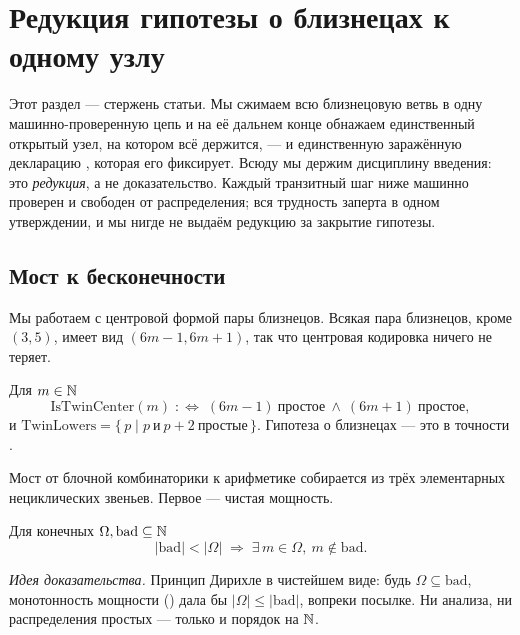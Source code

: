 \section{Редукция гипотезы о близнецах к одному узлу}\label{sec:reduction}

Этот раздел --- стержень статьи. Мы сжимаем всю близнецовую ветвь в одну машинно-проверенную цепь
и на её дальнем конце обнажаем единственный открытый узел, на котором всё держится, --- и
единственную заражённую  декларацию , которая его
фиксирует. Всюду мы держим дисциплину введения: это \emph{редукция}, а не доказательство. Каждый
транзитный шаг ниже \green{} машинно проверен и свободен от распределения; вся трудность заперта в
одном \red{} утверждении, и мы нигде не выдаём редукцию за закрытие гипотезы.

\subsection{Мост к бесконечности}

Мы работаем с центровой формой пары близнецов. Всякая пара близнецов, кроме $(3,5)$, имеет вид
$(6m-1,6m+1)$, так что центровая кодировка ничего не теряет.

\begin{definition}\label{def:istwincenter}
Для $m\in\mathbb{N}$
\[
  \mathrm{IsTwinCenter}(m)\;:\Longleftrightarrow\;(6m-1)\ \text{простое}\ \wedge\ (6m+1)\ \text{простое},
\]
и $\mathrm{TwinLowers}=\{\,p\mid p\ \text{и}\ p+2\ \text{простые}\,\}$. Гипотеза о близнецах --- это
в точности .
\end{definition}

Мост от блочной комбинаторики к арифметике собирается из трёх элементарных нециклических звеньев.
Первое --- чистая мощность.

\begin{theorem}\label{thm:survivor_of_not_covered}
Для конечных $\Omega,\mathrm{bad}\subseteq\mathbb{N}$
\begin{equation}\label{eq:survivor}
  |\mathrm{bad}|<|\Omega|\;\Longrightarrow\;\exists\,m\in\Omega,\ m\notin\mathrm{bad}.
\end{equation}
\end{theorem}

\emph{Идея доказательства.} Принцип Дирихле в чистейшем виде: будь $\Omega\subseteq\mathrm{bad}$,
монотонность мощности () дала бы $|\Omega|\le|\mathrm{bad}|$, вопреки
посылке. Ни анализа, ни распределения простых --- только  и порядок на $\mathbb{N}$. \green{}

